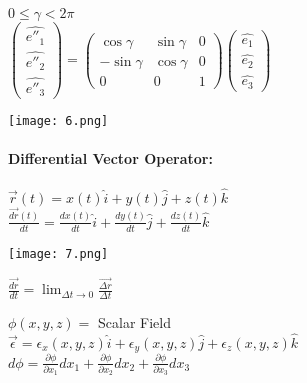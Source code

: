 \documentclass[12]{article}
\begin{document}
\begin{enumerate}
$0 \le \gamma <2\pi$\\

$\begin{pmatrix}
\hat{e''_{1}}\\
\hat{e''_{2}}\\
\hat{e''_{3}}
\end{pmatrix}=\begin{pmatrix}
\cos \gamma&\sin \gamma&0\\
-\sin \gamma& \cos \gamma&0\\
0&0&1
\end{pmatrix}\begin{pmatrix}
\hat{e_{1}}\\
\hat{e_{2}}\\
\hat{e_{3}}
\end{pmatrix}$\\

\begin{center}
\texttt{[image: 6.png]}
\end{center}

\end{enumerate}

 \paragraph*{Differential Vector Operator:}
 
$\vec{r}(t)=x(t)\hat{i}+y(t)\hat{j}+z(t)\hat{k}$\\

$\frac{\vec{dr}(t)}{dt}=\frac{dx(t)}{dt}\hat{i}+\frac{dy(t)}{dt}\hat{j}+\frac{dz(t)}{dt}\hat{k}   $ \\

\begin{center}
\texttt{[image: 7.png]}
\end{center}
 
 $\frac{\vec{dr}}{dt}=\lim_{\Delta t \to 0}\frac{\vec{\Delta r}}{\Delta t}$
 
 \newpage
 
 $\phi (x,y,z)=$ Scalar Field\\
 
 $\vec{\epsilon}=\epsilon_{x}(x,y,z)\hat{i}+\epsilon_{y}(x,y,z)\hat{j}+\epsilon_{z}(x,y,z)\hat{k}$\\
 
 $d \phi= \frac{\partial \phi}{\partial x_{1}}dx_{1}+\frac{\partial \phi}{\partial x_{2}}dx_{2}+\frac{\partial \phi}{\partial x_{3}}dx_{3}$\\
 
\end{document}
